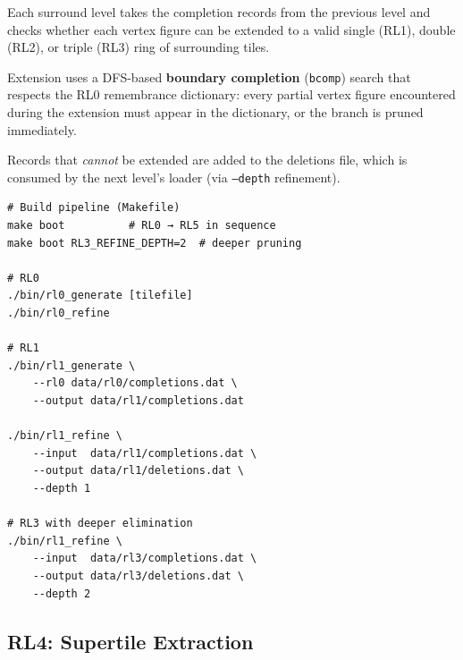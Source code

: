 \documentclass[10pt,a4paper]{article}
\newcommand{\code}[1]{\texttt{\small #1}}
\newcommand{\file}[1]{\texttt{\footnotesize #1}}
\begin{document}
\begin{tcolorbox}[dualbox, title=RL1–RL3 — Boundary Completion Filters — \file{src/rl1/} \ldots \file{src/rl3/}]
  Each surround level takes the completion records from the previous
  level and checks whether each vertex figure can be extended to a
  valid single (RL1), double (RL2), or triple (RL3) ring of surrounding
  tiles.

  Extension uses a DFS-based \textbf{boundary completion} (\code{bcomp})
  search that respects the RL0 remembrance dictionary: every partial
  vertex figure encountered during the extension must appear in the
  dictionary, or the branch is pruned immediately.

  Records that \emph{cannot} be extended are added to the
  deletions file, which is consumed by the next level's loader
  (via \code{--depth} refinement).

\tcblower
\begin{verbatim}
# Build pipeline (Makefile)
make boot          # RL0 → RL5 in sequence
make boot RL3_REFINE_DEPTH=2  # deeper pruning

# RL0
./bin/rl0_generate [tilefile]
./bin/rl0_refine

# RL1
./bin/rl1_generate \
    --rl0 data/rl0/completions.dat \
    --output data/rl1/completions.dat

./bin/rl1_refine \
    --input  data/rl1/completions.dat \
    --output data/rl1/deletions.dat \
    --depth 1

# RL3 with deeper elimination
./bin/rl1_refine \
    --input  data/rl3/completions.dat \
    --output data/rl3/deletions.dat \
    --depth 2
\end{verbatim}
\end{tcolorbox}

\subsection{RL4: Supertile Extraction}
\end{document}
